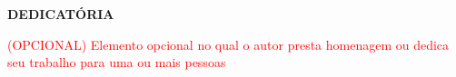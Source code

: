 \clearpage
\begin{dedicatoria}
\vspace*{\fill}
	\begin{center}
		\textbf{DEDICATÓRIA}\\
	\end{center}
	\textcolor{red}{(OPCIONAL) Elemento opcional no qual o autor presta homenagem
	ou dedica seu trabalho para uma ou mais pessoas}
\vspace*{\fill}
\end{dedicatoria}
